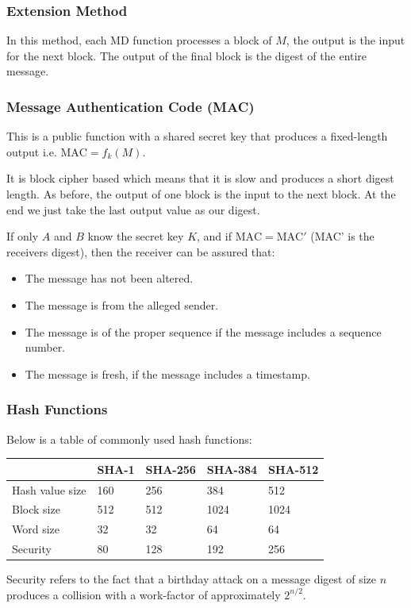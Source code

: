 \documentclass{article}
\begin{document}
\subsubsection{Extension Method}
In this method, each MD function processes a block of $M$, the output is the input for the next block. The output of the final block is the digest of the entire message.

\subsubsection{Message Authentication Code (MAC)}
This is a public function with a shared secret key that produces a fixed-length output i.e. $\text{MAC} = f_{k}(M)$.

It is block cipher based which means that it is slow and produces a short digest length. As before, the output of one block is the input to the next block. At the end we just take the last output value as our digest.

If only $A$ and $B$ know the secret key $K$, and if $\text{MAC} = \text{MAC}'$ (MAC' is the receivers digest), then the receiver can be assured that:
\begin{itemize}
  \item The message has not been altered.
  \item The message is from the alleged sender.
  \item The message is of the proper sequence if the message includes a sequence number.
  \item The message is fresh, if the message includes a timestamp.
\end{itemize}

\subsubsection{Hash Functions}
Below is a table of commonly used hash functions:
\begin{center}
  \begin{tabular}{|l|l|l|l|l|}
    \hline
    & SHA-1 & SHA-256 & SHA-384 & SHA-512 \\ \hline
    Hash value size & 160 & 256 & 384 & 512 \\ \hline
    Block size & 512 & 512 & 1024 & 1024 \\ \hline
    Word size & 32 & 32 & 64 & 64 \\ \hline
    Security & 80 & 128 & 192 & 256 \\
    \hline
  \end{tabular}
\end{center}
Security refers to the fact that a birthday attack on a message digest of size $n$ produces a collision with a work-factor of approximately $2^{n/2}$.
\end{document}
